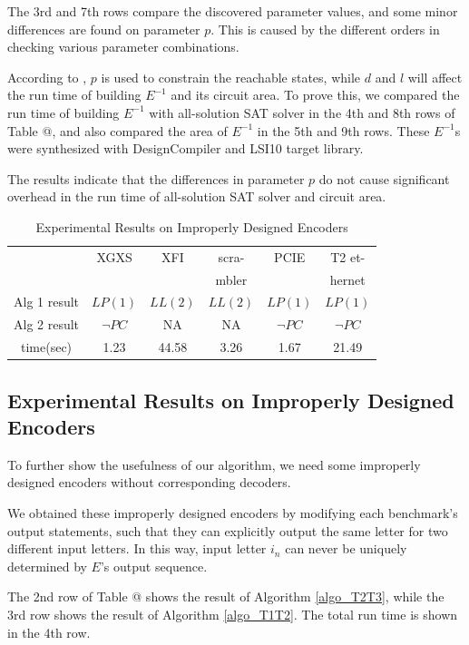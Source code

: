 \documentclass[journal]{IEEEtran}
\makeatletter
\newcommand{\Rmnum}[1]{\expandafter\@slowromancap\romannumeral #1@}
\makeatother
\begin{document}
The 3rd and 7th rows compare the discovered parameter values,
and some minor differences are found on parameter $p$.
This is caused by the different orders in checking various parameter combinations.

According to \cite{ShengYuShen:tcad},
$p$ is used to constrain the reachable states,
while $d$ and $l$ will affect the run time of building $E^{-1}$ and its circuit area.
To prove this,
we compared the run time of building $E^{-1}$ with all-solution SAT solver in the 4th and 8th rows of Table \Rmnum{2},
and also compared the area of $E^{-1}$ in the 5th and 9th rows.
These $E^{-1}$s were synthesized with DesignCompiler and LSI10 target library.


The results indicate that the differences in parameter $p$ do not cause significant overhead in the run time of all-solution SAT solver and circuit area.

\begin{table}[t]
\centering
\caption{Experimental Results on Improperly Designed Encoders}
\begin{tabular}{|c|c|c|c|c|c|}
\hline
&XGXS&XFI&scra-&PCIE&T2 et-\\
&&&mbler&&hernet\\ \hline
Alg 1 result   &$LP(1)$    &$LL(2)$     &$LL(2)$     &$LP(1)$   &$LP(1)$         \\\hline
Alg 2 result   &$\neg PC$       &NA     &NA        &$\neg PC$   &$\neg PC$          \\ \hline
time(sec)           &1.23      &44.58     &3.26      &1.67     &21.49          \\ \hline
\end{tabular}
\end{table}
\subsection{Experimental Results on Improperly Designed Encoders}
To further show the usefulness of our algorithm,
we need some improperly designed encoders without corresponding decoders.

We obtained these improperly designed encoders by modifying each benchmark's output statements,
such that they can explicitly output the same letter for two different input letters.
In this way,
input letter $i_n$ can never be uniquely determined by $E$'s output sequence.

The 2nd row of Table \Rmnum{3} shows the result of Algorithm \ref{algo_T2T3},
while the 3rd row shows the result of Algorithm \ref{algo_T1T2}.
The total run time is shown in the 4th row.
\end{document}
